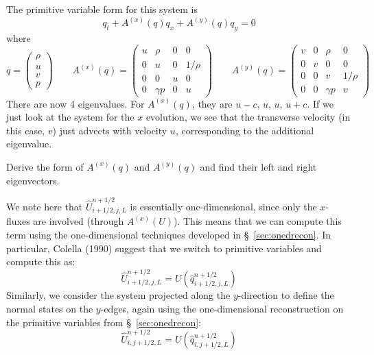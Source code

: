 The primitive variable form for this system is
\begin{equation}
q_t + A^{(x)}(q) q_x + A^{(y)}(q) q_y = 0
\end{equation}
where
\begin{equation}
q = \left ( \begin{array}{c} \rho \\ u \\ v \\ p \end{array} \right )
%
\qquad
A^{(x)}(q) = \left ( \begin{array}{cccc} u  & \rho     & 0 &  0 \\
                                         0  &  u       & 0 &  1/\rho \\
                                         0  &  0       & u &  0 \\
                                         0  & \gamma p & 0 &  u \end{array} \right )
\qquad
A^{(y)}(q) = \left ( \begin{array}{cccc} v  & 0 & \rho &  0 \\
                                         0  & v & 0    &  0 \\
                                         0  & 0 & v    &  1/\rho \\
                                         0  & 0 & \gamma p & v \end{array} \right )
\end{equation}
There are now 4 eigenvalues.  For $A^{(x)}(q)$, they are $u-c$, $u$,
$u$, $u+c$.  If we just look at the system for the $x$ evolution, we
see that the transverse velocity (in this case, $v$) just advects with
velocity $u$, corresponding to the additional eigenvalue.
\begin{exercise}
{
Derive the form of $A^{(x)}(q)$ and $A^{(y)}(q)$ and find their left and right eigenvectors.}
\end{exercise}

We note here that $\hat{U}_{i+1/2,j,L}^{n+1/2}$ is essentially
one-dimensional, since only the $x$-fluxes are involved (through
$A^{(x)}(U)$).  This means that we can compute this term using the
one-dimensional techniques developed in \S~\ref{sec:onedrecon}.  In
particular, Colella (1990) suggest that we switch to primitive variables
and compute this as:
\begin{equation}
\hat{U}_{i+1/2,j,L}^{n+1/2} = U(\hat{q}_{i+1/2,j,L}^{n+1/2})
\end{equation}
Similarly, we consider the system projected along the $y$-direction to
define the normal states on the $y$-edges, again using the one-dimensional
reconstruction on the primitive variables from \S~\ref{sec:onedrecon}:
\begin{equation}
\hat{U}_{i,j+1/2,L}^{n+1/2} = U(\hat{q}_{i,j+1/2,L}^{n+1/2})
\end{equation}

